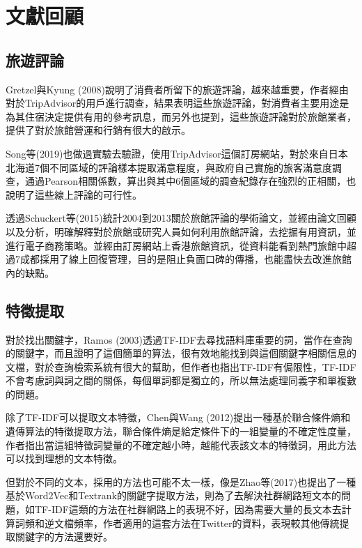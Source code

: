 %
%
\chapter{文獻回顧}

\section{旅遊評論}

	Gretzel與Kyung (2008)說明了消費者所留下的旅遊評論，越來越重要，作者經由對於TripAdvisor的用戶進行調查，結果表明這些旅遊評論，對消費者主要用途是為其住宿決定提供有用的參考訊息，而另外也提到，這些旅遊評論對於旅館業者，提供了對於旅館營運和行銷有很大的啟示。
	
	Song等(2019)也做過實驗去驗證，使用TripAdvisor這個訂房網站，對於來自日本北海道7個不同區域的評論樣本提取滿意程度，與政府自己實施的旅客滿意度調查，通過Pearson相關係數，算出與其中6個區域的調查紀錄存在強烈的正相關，也說明了這些線上評論的可行性。
	
	透過Schuckert等(2015)統計2004到2013關於旅館評論的學術論文，並經由論文回顧以及分析，明確解釋對於旅館或研究人員如何利用旅館評論，去挖掘有用資訊，並進行電子商務策略。並經由訂房網站上香港旅館資訊，從資料能看到熱門旅館中超過7成都採用了線上回復管理，目的是阻止負面口碑的傳播，也能盡快去改進旅館內的缺點。
	
\newpage

\section{特徵提取}

	對於找出關鍵字，Ramos (2003)透過TF-IDF去尋找語料庫重要的詞，當作在查詢的關鍵字，而且證明了這個簡單的算法，很有效地能找到與這個關鍵字相關信息的文檔，對於查詢檢索系統有很大的幫助，但作者也指出TF-IDF有侷限性，TF-IDF不會考慮詞與詞之間的關係，每個單詞都是獨立的，所以無法處理同義字和單複數的問題。
	
	除了TF-IDF可以提取文本特徵，Chen與Wang (2012)提出一種基於聯合條件熵和遺傳算法的特徵提取方法，聯合條件熵是給定條件下的一組變量的不確定性度量，作者指出當這組特徵詞變量的不確定越小時，越能代表該文本的特徵詞，用此方法可以找到理想的文本特徵。
	
	但對於不同的文本，採用的方法也可能不太一樣，像是Zhao等(2017)也提出了一種基於Word2Vec和Textrank的關鍵字提取方法，則為了去解決社群網路短文本的問題，如TF-IDF這類的方法在社群網路上的表現不好，因為需要大量的長文本去計算詞頻和逆文檔頻率，作者適用的這套方法在Twitter的資料，表現較其他傳統提取關鍵字的方法還要好。
	
